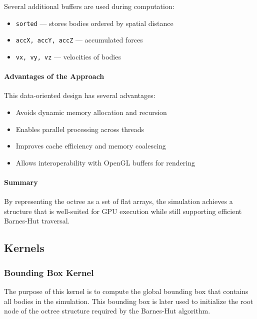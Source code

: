 \documentclass[12pt]{article}
\begin{document}
Several additional buffers are used during computation:

\begin{itemize}
    \item \texttt{sorted} — stores bodies ordered by spatial distance
    \item \texttt{accX, accY, accZ} — accumulated forces
    \item \texttt{vx, vy, vz} — velocities of bodies
\end{itemize}

\paragraph{Advantages of the Approach}

This data-oriented design has several advantages:

\begin{itemize}
    \item Avoids dynamic memory allocation and recursion
    \item Enables parallel processing across threads
    \item Improves cache efficiency and memory coalescing
    \item Allows interoperability with OpenGL buffers for rendering
\end{itemize}

\paragraph{Summary}

By representing the octree as a set of flat arrays, the simulation achieves a structure
that is well-suited for GPU execution while still supporting efficient Barnes-Hut traversal.

\subsection{Kernels}

\subsubsection{Bounding Box Kernel}

The purpose of this kernel is to compute the global bounding box that contains all bodies in the simulation.
This bounding box is later used to initialize the root node of the octree structure required by the Barnes-Hut algorithm.
\end{document}

